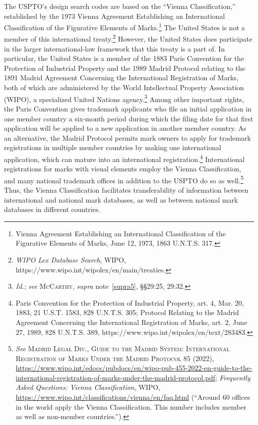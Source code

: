 \documentclass[letterpaper, 11pt, oneside]{article}
\begin{document}
The USPTO's design search codes are based on the ``Vienna Classification,'' established by the 1973 Vienna Agreement Establishing an International Classification of the Figurative Elements of Marks.\footnote{Vienna Agreement Establishing an International Classification of the Figurative Elements of Marks, June 12, 1973, 1863 U.N.T.S. 317.} The United States is not a member of this international treaty.\footnote{\textit{WIPO Lex Database Search}, WIPO, https://www.wipo.int/wipolex/en/main/treaties.} However, the United States does participate in the larger international-law framework that this treaty is a part of. In particular, the United States is a member of the 1883 Paris Convention for the Protection of Industrial Property and the 1989 Madrid Protocol relating to the 1891 Madrid Agreement Concerning the International Registration of Marks, both of which are administered by the World Intellectual Property Association (WIPO), a specialized United Nations agency.\footnote{\textit{Id.}; \textit{see} \textsc{McCarthy}, \textit{supra} note~\ref{supra5}, \S\S 29:25, 29:32.} Among other important rights, the Paris Convention gives trademark applicants who file an initial application in one member country a six-month period during which the filing date for that first application will be applied to a new application in another member country. As an alternative, the Madrid Protocol permits mark owners to apply for trademark registrations in multiple member countries by making one international application, which can mature into an international registration.\footnote{Paris Convention for the Protection of Industrial Property, art. 4, Mar. 20, 1883, 21 U.S.T. 1583, 828 U.N.T.S. 305; Protocol Relating to the Madrid Agreement Concerning the International Registration of Marks, art. 2, June 27, 1989, 828 U.N.T.S. 389, https://www.wipo.int/wipolex/en/text/283483.} International registrations for marks with visual elements employ the Vienna Classification, and many national trademark offices in addition to the USPTO do so as well.\footnote{\textit{See} \textsc{Madrid Legal Div., Guide to the Madrid System: International Registration of Marks Under the Madrid Protocol} 85 (2022), \url{https://www.wipo.int/edocs/pubdocs/en/wipo-pub-455-2022-en-guide-to-the-international-registration-of-marks-under-the-madrid-protocol.pdf}; \textit{Frequently Asked Questions: Vienna Classification}, WIPO, \url{https://www.wipo.int/classifications/vienna/en/faq.html} (``Around 60 offices in the world apply the Vienna Classification. This number includes member as well as non-member countries.'').} Thus, the Vienna Classification facilitates transferability of information between international and national mark databases, as well as between national mark databases in different countries.
\end{document}
